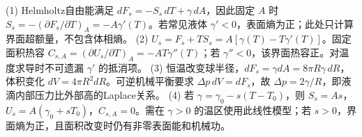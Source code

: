 (1) Helmholtz自由能满足 \(dF_s=-S_s\,dT+\gamma\,dA\)，因此固定 \(A\) 时 \(S_s=-(\partial F_s/\partial T)_A=-A\gamma'(T)\)。若常见液体 \(\gamma'<0\)，表面熵为正；此处只计算界面超额量，不包含体相熵。
(2) \(U_s=F_s+TS_s=A[\gamma(T)-T\gamma'(T)]\)。固定面积热容 \(C_{s,A}=(\partial U_s/\partial T)_A=-AT\gamma''(T)\)；若 \(\gamma''<0\)，该界面热容正。对温度求导时不可遗漏 \(\gamma'\) 的抵消项。
(3) 恒温改变球半径，\(dF_s=\gamma dA=8\pi R\gamma\,dR\)，体积变化 \(dV=4\pi R^2dR\)。可逆机械平衡要求 \(\Delta p\,dV=dF_s\)，故 \(\Delta p=2\gamma/R\)，即液滴内部压力比外部高的Laplace关系。
(4) 若 \(\gamma=\gamma_0-s(T-T_0)\)，则 \(S_s=As\)，\(U_s=A(\gamma_0+sT_0)\)，\(C_{s,A}=0\)。需在 \(\gamma>0\) 的温区使用此线性模型；若 \(s>0\)，界面熵为正，且面积改变时仍有非零表面能和机械功。
